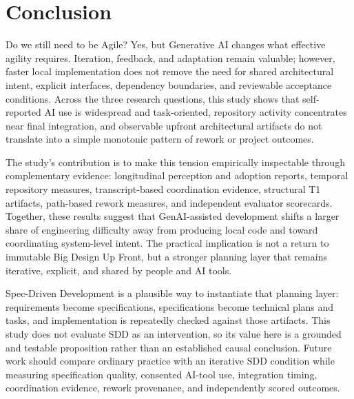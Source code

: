 \section{Conclusion}
Do we still need to be Agile? Yes, but Generative AI changes what effective
agility requires. Iteration, feedback, and adaptation remain valuable; however,
faster local implementation does not remove the need for shared architectural
intent, explicit interfaces, dependency boundaries, and reviewable acceptance
conditions. Across the three research questions, this study shows that
self-reported AI use is widespread and task-oriented, repository activity concentrates near final
integration, and observable upfront architectural artifacts do not translate
into a simple monotonic pattern of rework or project outcomes.

The study's contribution is to make this tension empirically inspectable through
complementary evidence: longitudinal perception and adoption reports, temporal
repository measures, transcript-based coordination evidence, structural T1
artifacts, path-based rework measures, and independent evaluator scorecards.
Together, these results suggest that GenAI-assisted development shifts a larger
share of engineering difficulty away from producing local code and toward
coordinating system-level intent. The practical implication is not a return to
immutable Big Design Up Front, but a stronger planning layer that remains
iterative, explicit, and shared by people and AI tools.

Spec-Driven Development is a plausible way to instantiate that planning layer:
requirements become specifications, specifications become technical plans and
tasks, and implementation is repeatedly checked against those artifacts. This
study does not evaluate SDD as an intervention, so its value here is a grounded
and testable proposition rather than an established causal conclusion. Future
work should compare ordinary practice with an iterative SDD condition while
measuring specification quality, consented AI-tool use, integration timing,
coordination evidence, rework provenance, and independently scored outcomes.

